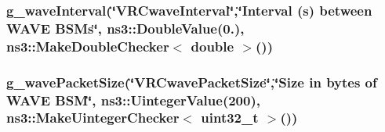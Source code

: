 \subsubsection[{\texorpdfstring{g\+\_\+wave\+Interval}{g_waveInterval}}]{ g\+\_\+wave\+Interval(\char`\"{}V\+R\+Cwave\+Interval\char`\"{},\char`\"{}Interval ({\bf s}) between W\+A\+VE B\+S\+Ms\char`\"{}, ns3\+::\+Double\+Value(0.), {\bf ns3\+::\+Make\+Double\+Checker}$<$ double $>$())\hspace{0.3cm}{\ttfamily [static]}}\hypertarget{vanet-routing-compare_8cc_a27f3f3442407dc38d5a31a37053fb536}{}\label{vanet-routing-compare_8cc_a27f3f3442407dc38d5a31a37053fb536}
\subsubsection[{\texorpdfstring{g\+\_\+wave\+Packet\+Size}{g_wavePacketSize}}]{ g\+\_\+wave\+Packet\+Size(\char`\"{}V\+R\+Cwave\+Packet\+Size\char`\"{},\char`\"{}Size in bytes of W\+A\+VE B\+SM\char`\"{}, ns3\+::\+Uinteger\+Value(200), {\bf ns3\+::\+Make\+Uinteger\+Checker}$<$ uint32\+\_\+t $>$())\hspace{0.3cm}{\ttfamily [static]}}\hypertarget{vanet-routing-compare_8cc_ac52879c1710daa8cb10df8883d2c7361}{}\label{vanet-routing-compare_8cc_ac52879c1710daa8cb10df8883d2c7361}
